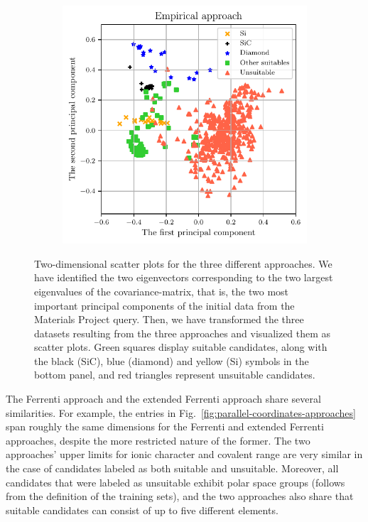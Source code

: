 \documentclass[superscriptaddress,unsortedaddress,
 amsmath,amssymb,
 aps,
]{revtex4-2}
\begin{document}
\begin{figure}
\begin{subfigure}{0.35\textwidth}
    \end{subfigure}
    \begin{subfigure}{0.4\textwidth}
        \centering
        \includegraphics[width=1\textwidth]{figures/pca-2d-plots/03-insightful-approach.pdf}
    \end{subfigure}
    \caption{Two-dimensional scatter plots for the three different approaches. We have identified the two eigenvectors corresponding to the two largest eigenvalues of the covariance-matrix, that is, the two most important principal components of the initial data from the Materials Project query. Then, we have transformed the three datasets resulting from the three approaches and visualized them as scatter plots. Green squares display suitable candidates, along with the black (SiC), blue (diamond) and yellow (Si) symbols in the bottom panel, and red triangles represent unsuitable candidates.}
    \label{fig:2dscatterplotpca}
\end{figure}


The Ferrenti approach and the extended Ferrenti approach share several similarities. For example, the entries in  Fig.~\ref{fig:parallel-coordinates-approaches} span roughly the same dimensions for the Ferrenti and extended Ferrenti approaches, despite the more restricted nature of the former.  
The two approaches' upper limits for ionic character and covalent range are very similar in the case of candidates labeled as both suitable and unsuitable.   
Moreover, all candidates that were labeled as unsuitable exhibit polar space groups (follows from the definition of the training sets), and the two approaches also share that suitable candidates can consist of up to five different elements. 
\end{document}

